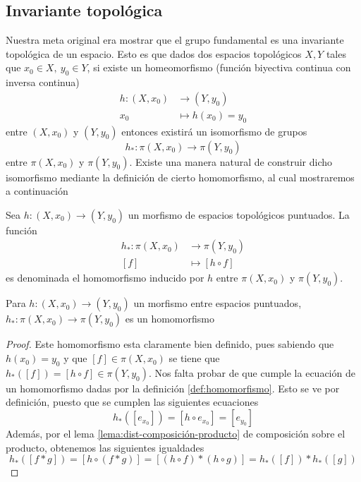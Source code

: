 {\subsection{Invariante topológica}
Nuestra meta original era mostrar que el grupo fundamental es una
invariante topológica de un espacio. Esto es que dados dos
espacios topológicos \(X,Y\) tales que \(x_0 \in X,\ y_0 \in Y\), si
existe un homeomorfismo (función biyectiva continua con inversa
continua)
\begin{align*}
  h : (X, x_0) &\longrightarrow (Y, y_0) \\
  x_0 &\longmapsto h(x_0) = y_0
\end{align*}
entre \((X, x_0)\) y \((Y, y_0)\) entonces existirá un isomorfismo de
grupos
\[ h_{*} : \pi (X, x_0) \longrightarrow \pi (Y, y_0) \]
entre \(\pi (X, x_0)\) y \(\pi (Y, y_0)\). Existe una manera natural de
construir dicho isomorfismo mediante la definición de cierto
homomorfismo, al cual mostraremos a continuación
\begin{definicion} \label{def:homomorfismo-inducido}
  Sea \(h : (X, x_0) \longrightarrow (Y, y_0)\) un morfismo de
  espacios topológicos puntuados. La función
  \begin{align*}
    h_* : \pi (X, x_0) &\longrightarrow \pi (Y, y_0) \\
    [f] &\longmapsto [h \circ f]
  \end{align*}
  es denominada el homomorfismo inducido por \(h\) entre \(\pi (X,
  x_0)\) y \(\pi (Y, y_0)\).
\end{definicion}
\begin{teorema} \label{thm:morfismo-homomorfismo}
  Para \(h : (X, x_0) \to (Y, y_0)\) un morfismo entre espacios
  puntuados, \(h_* : \pi (X, x_0) \to \pi (Y, y_0)\) es un homomorfismo
\end{teorema}
\begin{proof}
  Este homomorfismo esta claramente bien definido, pues sabiendo que \(h
  (x_0) = y_0\) y que \([f] \in \pi (X, x_0)\) se tiene que \(h_* ([f]) =
  [h \circ f] \in \pi (Y, y_0)\). Nos falta probar de que cumple la
  ecuación de un homomorfismo dadas por la definición
  \ref{def:homomorfismo}. Esto se ve por definición, puesto que se cumplen
  las siguientes ecuaciones
  \[ h_{*} ([e_{x_0}]) = [h \circ e_{x_0}] = [e_{y_0}]\]
  Además, por el lema \ref{lema:dist-composición-producto} de composición
  sobre el producto, obtenemos las siguientes igualdades
  \[ h_{*} ([f * g]) = [h \circ (f * g)] = [(h \circ f) * (h \circ g)]
    = h_{*} ([f]) * h_{*} ([g])\]

\end{proof}}
